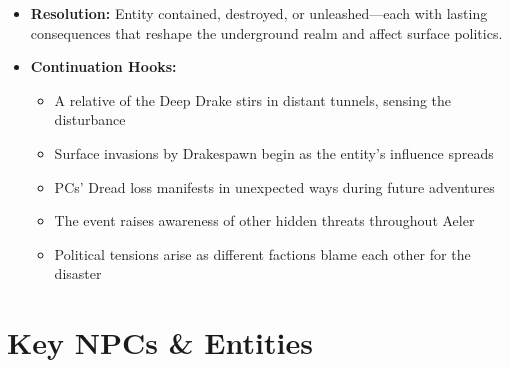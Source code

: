 \documentclass[11pt]{article}
\begin{document}
\begin{itemize}
\begin{itemize}
  \end{itemize}
\item \textbf{Resolution:} Entity contained, destroyed, or unleashed—each with lasting consequences that reshape the underground realm and affect surface politics.
\item \textbf{Continuation Hooks:}
  \begin{itemize}
  \item A relative of the Deep Drake stirs in distant tunnels, sensing the disturbance
  \item Surface invasions by Drakespawn begin as the entity's influence spreads
  \item PCs' Dread loss manifests in unexpected ways during future adventures
  \item The event raises awareness of other hidden threats throughout Aeler
  \item Political tensions arise as different factions blame each other for the disaster
  \end{itemize}
\end{itemize}

\section{Key NPCs \& Entities}
\end{document}
